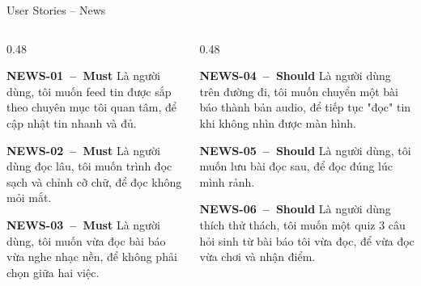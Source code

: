 \documentclass[aspectratio=169]{beamer}
\begin{document}
\begin{frame}{User Stories -- News}
  \begin{columns}
    \begin{column}{0.48\textwidth}
      \begin{block}{\scriptsize\bfseries NEWS-01~--~Must}
        {\tiny Là người dùng, tôi muốn feed tin được sắp theo chuyên mục tôi quan tâm, để cập nhật tin nhanh và đủ.}
      \end{block}
      \begin{block}{\scriptsize\bfseries NEWS-02~--~Must}
        {\tiny Là người dùng đọc lâu, tôi muốn trình đọc sạch và chỉnh cỡ chữ, để đọc không mỏi mắt.}
      \end{block}
      \begin{block}{\scriptsize\bfseries NEWS-03~--~Must}
        {\tiny Là người dùng, tôi muốn vừa đọc bài báo vừa nghe nhạc nền, để không phải chọn giữa hai việc.}
      \end{block}
    \end{column}
    \begin{column}{0.48\textwidth}
      \begin{block}{\scriptsize\bfseries NEWS-04~--~Should}
        {\tiny Là người dùng trên đường đi, tôi muốn chuyển một bài báo thành bản audio, để tiếp tục "đọc" tin khi không nhìn được màn hình.}
      \end{block}
      \begin{block}{\scriptsize\bfseries NEWS-05~--~Should}
        {\tiny Là người dùng, tôi muốn lưu bài đọc sau, để đọc đúng lúc mình rảnh.}
      \end{block}
      \begin{block}{\scriptsize\bfseries NEWS-06~--~Should}
        {\tiny Là người dùng thích thử thách, tôi muốn một quiz 3 câu hỏi sinh từ bài báo tôi vừa đọc, để vừa đọc vừa chơi và nhận điểm.}
      \end{block}
    \end{column}
  \end{columns}
\end{frame}
\end{document}

